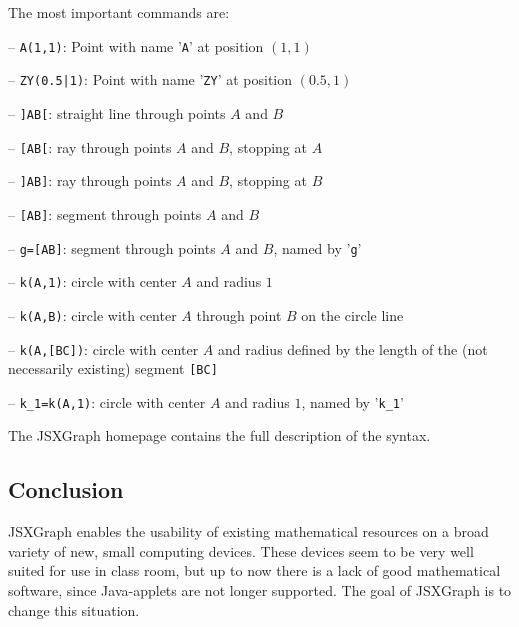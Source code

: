 \documentclass[12pt,a4paper]{article}%
\begin{document}
The most important commands are:
\begin{description}
\item{-- \verb+A(1,1)+:} Point with name '\verb|A|' at position $(1,1)$
\item{-- \verb+ZY(0.5|1)+:} Point with name '\verb|ZY|' at position $(0.5,1)$
\item{-- \verb|]AB[|:} straight line through points $A$ and $B$
\item{-- \verb|[AB[|:} ray through points $A$ and $B$, stopping at $A$
\item{-- \verb|]AB]|:} ray through points $A$ and $B$, stopping at $B$
\item{-- \verb|[AB]|:} segment through points $A$ and $B$
\item{-- \verb|g=[AB]|:} segment through points $A$ and $B$, named by '\verb|g|'
\item{-- \verb|k(A,1)|:} circle with center $A$ and radius $1$
\item{-- \verb|k(A,B)|:} circle with center $A$ through point $B$ on the circle line
\item{-- \verb|k(A,[BC])|:} circle with center $A$ and radius defined by the length of the 
(not necessarily existing) segment \verb|[BC]|
\item{-- \verb|k_1=k(A,1)|:} circle with center $A$ and radius $1$, named by '\verb|k_1|' 
\end{description}

The JSXGraph homepage contains the full description of the syntax.

\subsection{Conclusion}
JSXGraph enables the usability of existing mathematical resources on a broad variety of new, small computing devices. These devices seem to be very well suited for use in class room, but up to now there is a lack of good mathematical software, since Java-applets are not longer supported. The goal of JSXGraph is to change this situation.
\end{document}
